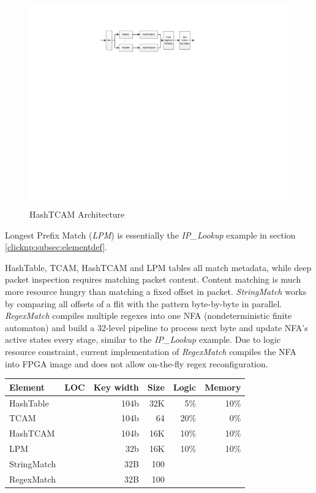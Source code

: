 \begin{figure}[h!]
	\centering
	\includegraphics[width=1.0\columnwidth]{image/HashTCAM}
	\vspace{-0.30in}
	\caption{HashTCAM Architecture}
	\vspace{-0.10in}
	\label{clicknp:fig:HashTCAM}
\end{figure}

Longest Prefix Match (\textit{LPM}) is essentially the \textit{IP\_Lookup} example in section \ref{clicknp:subsec:elementdef}.

HashTable, TCAM, HashTCAM and LPM tables all match metadata, while deep packet inspection requires matching packet content. Content matching is much more resource hungry than matching a fixed offset in packet. \textit{StringMatch} works by comparing all offsets of a flit with the pattern byte-by-byte in parallel. \textit{RegexMatch} compiles multiple regexes into one NFA (nondeterministic finite automaton) and build a 32-level pipeline to process next byte and update NFA's active states every stage, similar to the \textit{IP\_Lookup} example. Due to logic resource constraint, current implementation of \textit{RegexMatch} compiles the NFA into FPGA image and does not allow on-the-fly regex reconfiguration.

\begin{table}[h!]
	\centering
	\label{clicknp:tab:LookupTables}
	\begin{tabular}{l|r|r|r|r|r}
		Element & LOC & Key width & Size & Logic & Memory \\
		\hline
		HashTable 	& & 104b & 32K 	& 5\%  & 10\% \\
		TCAM 		& & 104b & 64	& 20\% & 0\% \\
		HashTCAM 	& & 104b & 16K    & 10\% & 10\% \\
		LPM			& & 32b  & 16K    & 10\% & 10\% \\
		StringMatch & & 32B  & 100	& & \\
		RegexMatch  & & 32B  & 100  & & \\
	\end{tabular}
\end{table}

